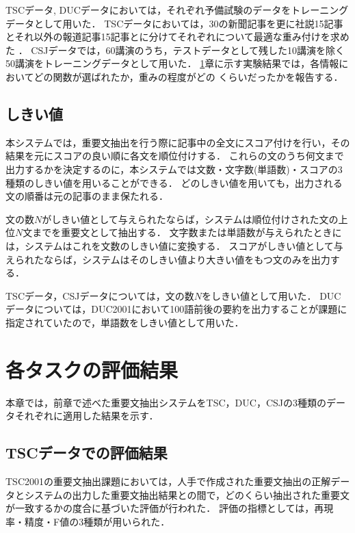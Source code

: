 TSCデータ, DUCデータにおいては，それぞれ予備試験のデータをトレーニングデータとして用いた．
TSCデータにおいては，30の新聞記事を更に社説15記事とそれ以外の報道記事15記事とに分けてそれぞれについて最適な重み付けを求めた
\footnotemark．
CSJデータでは，60講演のうち，テストデータとして残した10講演を除く50講演をトレーニングデータとして用いた．
\ref{section:evaluation}章に示す実験結果では，各情報においてどの関数が選ばれたか，重みの程度がどの
くらいだったかを報告する．

\subsection{しきい値}

本システムでは，重要文抽出を行う際に記事中の全文にスコア付けを行い，その結果を元にスコアの良い順に各文を順位付けする．
これらの文のうち何文まで出力するかを決定するのに，本システムでは文数・文字数(単語数)・スコアの3種類のしきい値を用いることができる．
どのしきい値を用いても，出力される文の順番は元の記事のまま保たれる．

文の数\(N\)がしきい値として与えられたならば，システムは順位付けされた文の上位\(N\)文までを重要文として抽出する．
文字数または単語数が与えられたときには，システムはこれを文数のしきい値に変換する．
スコアがしきい値として与えられたならば，システムはそのしきい値より大きい値をもつ文のみを出力する．

TSCデータ，CSJデータについては，文の数\(N\)をしきい値として用いた．
DUCデータについては，DUC2001において100語前後の要約を出力することが課題に指定されていたので，単語数をしきい値として用いた．

\section{各タスクの評価結果}
\label{section:evaluation}

本章では，前章で述べた重要文抽出システムをTSC，DUC，CSJの3種類のデータそれぞれに適用した結果を示す．

\subsection{TSCデータでの評価結果}

TSC2001の重要文抽出課題においては，人手で作成された重要文抽出の正解データとシステムの出力した重要文抽出結果との間で，どのくらい抽出された重要文が一致するかの度合に基づいた評価が行われた．
評価の指標としては，再現率・精度・F値の3種類\footnotemark{}が用いられた．

